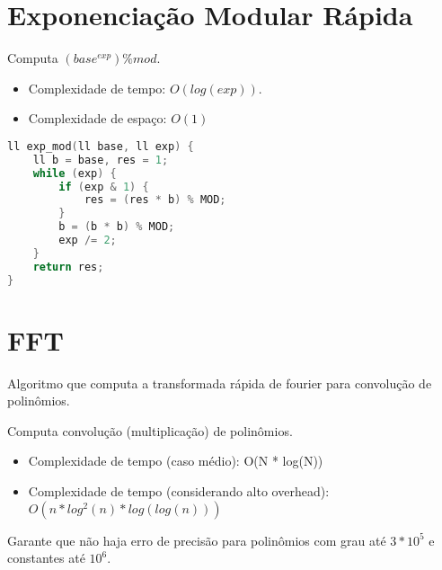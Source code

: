 \documentclass[11pt, a4paper, oneside]{book}
\begin{document}
\hfill

\section{Exponenciação Modular Rápida}


Computa $(base^{exp}) \% mod$.



\begin{itemize}
\item Complexidade de tempo: $O(log(exp))$.
\item Complexidade de espaço: $O(1)$
\end{itemize}

\hfill

\begin{multicols}{2}
\begin{lstlisting}[language=C++]
ll exp_mod(ll base, ll exp) {
    ll b = base, res = 1;
    while (exp) {
        if (exp & 1) {
            res = (res * b) % MOD;
        }
        b = (b * b) % MOD;
        exp /= 2;
    }
    return res;
}
\end{lstlisting}
\end{multicols}

\hfill

\section{FFT}


Algoritmo que computa a transformada rápida de fourier para convolução de polinômios.



Computa convolução (multiplicação) de polinômios.



\begin{itemize}
\item Complexidade de tempo (caso médio): O(N * log(N))
\item Complexidade de tempo (considerando alto overhead): $O(n * log^2(n) * log(log(n)))$
\end{itemize}



Garante que não haja erro de precisão para polinômios com grau até $3 * 10^5$ e constantes até $10^6$.
\hfill
\end{document}
